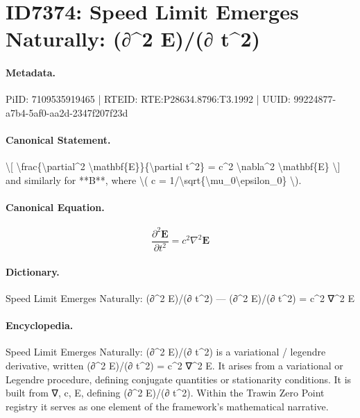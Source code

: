 \section*{ID7374: Speed Limit Emerges Naturally: (∂\textasciicircum{}2 E)/(∂ t\textasciicircum{}2)}
\paragraph{Metadata.}
PiID: 7109535919465 | RTEID: RTE:P28634.8796:T3.1992 | UUID: 99224877-a7b4-5af0-aa2d-2347f207f23d

\paragraph{Canonical Statement.}
\textbackslash{}[ \textbackslash{}frac\{\textbackslash{}partial\textasciicircum{}2 \textbackslash{}mathbf\{E\}\}\{\textbackslash{}partial t\textasciicircum{}2\} = c\textasciicircum{}2 \textbackslash{}nabla\textasciicircum{}2 \textbackslash{}mathbf\{E\} \textbackslash{}] and similarly for **B**, where \textbackslash{}( c = 1/\textbackslash{}sqrt\{\textbackslash{}mu\_0\textbackslash{}epsilon\_0\} \textbackslash{}).

\paragraph{Canonical Equation.}
\[
\frac{\partial^2 \mathbf{E}}{\partial t^2} = c^2 \nabla^2 \mathbf{E}
\]

\paragraph{Dictionary.}
Speed Limit Emerges Naturally: (∂\textasciicircum{}2 E)/(∂ t\textasciicircum{}2) — (∂\textasciicircum{}2 E)/(∂ t\textasciicircum{}2) = c\textasciicircum{}2 ∇\textasciicircum{}2 E

\paragraph{Encyclopedia.}
Speed Limit Emerges Naturally: (∂\textasciicircum{}2 E)/(∂ t\textasciicircum{}2) is a variational / legendre derivative, written (∂\textasciicircum{}2 E)/(∂ t\textasciicircum{}2) = c\textasciicircum{}2 ∇\textasciicircum{}2 E. It arises from a variational or Legendre procedure, defining conjugate quantities or stationarity conditions. It is built from ∇, c, E, defining (∂\textasciicircum{}2 E)/(∂ t\textasciicircum{}2). Within the Trawin Zero Point registry it serves as one element of the framework's mathematical narrative.
